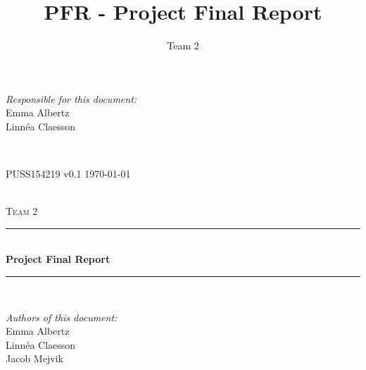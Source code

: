 \documentclass[a4paper]{article}
\title{PFR - Project Final Report}
\author{Team 2}
\begin{document}
\begin{titlepage}
\newcommand{\HRule}{\rule{\linewidth}{0.5mm}}

\begin{minipage}{0.5\textwidth}
\begin{flushleft} %
\textit{Responsible for this document:}\\
Emma Albertz \\
Linnéa Claesson
\end{flushleft}
\end{minipage}
~
\begin{minipage}{0.4\textwidth}
\begin{flushright}
PUSS154219 v0.1 
\today
\end{flushright}
\end{minipage}\\[3cm]

\centering
\textsc{\LARGE Team 2}\\[0.5cm]

\HRule \\[0.4cm]
{ \huge \bfseries Project Final Report}\\[0.4cm] %
\HRule \\[1.5cm]

\vfill
\begin{flushleft}
\textit{Authors of this document:}\\
Emma Albertz \\
Linnéa Claesson\\
Jacob Mejvik
\end{flushleft}



\end{titlepage}



%



\setcounter{tocdepth}{2}
\tableofcontents
\newpage
{}
\end{document}

